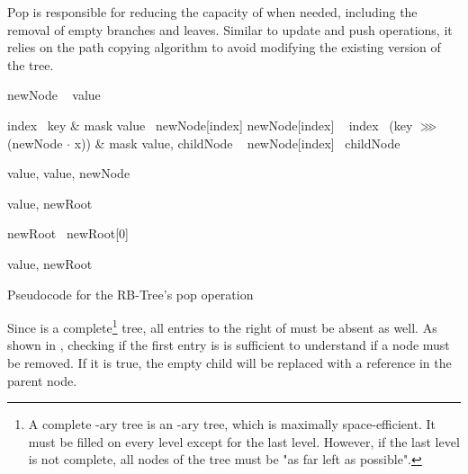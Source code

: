 Pop is responsible for reducing the capacity of \treerb{} when needed, including the removal of empty branches and leaves. Similar to update and push operations, it relies on the path copying algorithm to avoid modifying the existing version of the tree.

\begin{listing}[ht!]

    \begin{algorithmic}[1]
            \State newNode \la\ 
            \State value \la\ \nil{}

                \State index \la\ key \& mask
                \State value \la\ newNode[index]
                \State newNode[index] \la\ \nil{}
            \Else
                \State index \la\ (key $\ggg$ (newNode $\cdot$ x)) \& mask
                \State value, childNode \la\ 
                \State newNode[index] \la\ childNode
            \EndIf

                \State \Return value, \nil{}
            \Else
                \State \Return value, newNode
            \EndIf
        \EndFunction

        \State

            \State value, newRoot \la\ 

                \State newRoot \la\ newRoot[0]
            \EndIf

            \State \Return value, newRoot
        \EndFunction
    \end{algorithmic}

    \caption{Pseudocode for the RB-Tree's pop operation}
    \label{lst:rb-tree-pop}
\end{listing}

Since \treerb{} is a complete\footnote{A complete \m{}-ary tree is an \m{}-ary tree, which is maximally space-efficient. It must be filled on every level except for the last level. However, if the last level is not complete, all nodes of the tree must be "as far left as possible".} tree, all entries to the right of \nil{} must be absent as well. As shown in , checking if the first entry is \nil{} is sufficient to understand if a node must be removed. If it is true, the empty child will be replaced with a \nil{} reference in the parent node.


